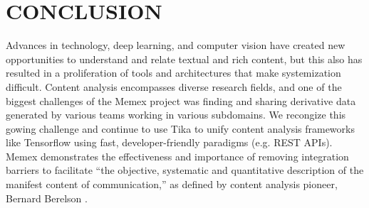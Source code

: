 \section{CONCLUSION} \label{sec:future}
Advances in technology, deep learning, and computer vision have created new opportunities to understand and relate textual and rich content, but this also has resulted in a proliferation of tools and architectures that make systemization difficult. Content analysis encompasses diverse research fields, and one of the biggest challenges of the Memex project was finding and sharing derivative data generated by various teams working in various subdomains. We recongize this gowing challenge and continue to use Tika to unify content analysis frameworks like Tensorflow using fast, developer-friendly paradigms (e.g. REST APIs).  Memex demonstrates the effectiveness and importance of removing integration barriers to facilitate ``the objective, systematic and quantitative description of the manifest content of communication,'' as defined by content analysis pioneer, Bernard Berelson \cite{berelson1952content}.  